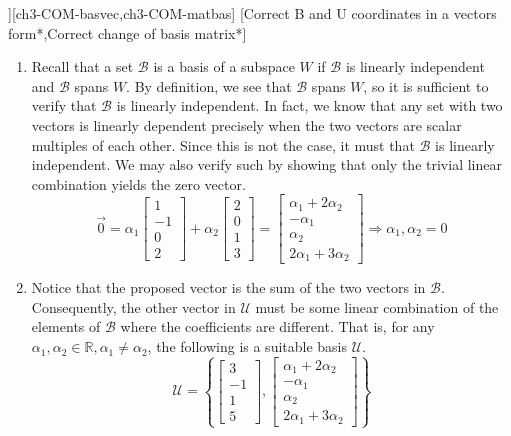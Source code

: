 \begin{SaveQuestion}
][ch3-COM-basvec,ch3-COM-matbas] %
    [Correct B and U coordinates in a vectors form*,Correct change of basis matrix*]    %
    \begin{enumerate}
        \item Recall that a set $\mathcal B$ is a basis of a subspace $W$ if $\mathcal B$ is linearly independent and $\mathcal B$ spans $W$. By definition, we see that $\mathcal B$ spans $W$, so it is sufficient to verify that $\mathcal B$ is linearly independent. In fact, we know that any set with two vectors is linearly dependent precisely when the two vectors are scalar multiples of each other. Since this is not the case, it must that $\mathcal B$ is linearly independent. We may also verify such by showing that only the trivial linear combination yields the zero vector.
        $$\vec 0 = \alpha_1 \begin{bmatrix} 1 \\ -1 \\ 0 \\ 2 \end{bmatrix} + \alpha_2 \begin{bmatrix} 2 \\ 0 \\ 1 \\ 3 \end{bmatrix} = \begin{bmatrix} \alpha_1 + 2 \alpha _2 \\ - \alpha_1 \\ \alpha_2 \\ 2\alpha_1 + 3\alpha_2 \end{bmatrix} \Longrightarrow \alpha_1, \alpha_2 = 0$$
        \item Notice that the proposed vector is the sum of the two vectors in $\mathcal B$. Consequently, the other vector in $\mathcal U$ must be some linear combination of the elements of $\mathcal B$ where the coefficients are different. That is, for any $\alpha_1, \alpha_2 \in \mathbb{R}, \alpha_1 \neq \alpha_2$, the following is a suitable basis $\mathcal U$.
        $$\mathcal U = \left\{\begin{bmatrix} 3 \\ -1 \\ 1 \\ 5 \end{bmatrix},  \begin{bmatrix} \alpha_1 + 2 \alpha _2 \\ - \alpha_1 \\ \alpha_2 \\ 2\alpha_1 + 3\alpha_2 \end{bmatrix}\right\}$$

\end{enumerate}
\end{SaveQuestion}
